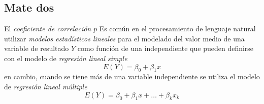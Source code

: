 \subsection{Mate dos}
El \emph{coeficiente de correlación} $p$
    Es común en el procesamiento de lenguaje natural utilizar \emph{modelos estadísticos lineales} para el modelado del valor medio de una variable de resultado $Y$ como función de una independiente que pueden definirse con el modelo de \emph{regresión lineal simple}
    \begin{equation}
    E(Y)=\beta_0+\beta_1x
    \end{equation}
    en cambio, cuando se tiene más de una variable independiente se utiliza el modelo de \emph{regresión lineal múltiple}
    \begin{equation}
    E(Y)=\beta_0+\beta_1x+\ldots+\beta_kx_k
    \end{equation}